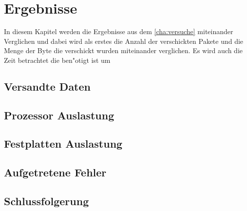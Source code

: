 \chapter{Ergebnisse}
In diesem Kapitel werden die Ergebnisse aus dem \cref{cha:versuche} miteinander Verglichen %
und dabei wird als erstes die Anzahl der verschickten Pakete und die Menge der Byte die %
verschickt wurden miteinander verglichen. Es wird auch die Zeit betrachtet die ben"otigt %
ist um 



\section{Versandte Daten}

\section{Prozessor Auslastung}

\section{Festplatten Auslastung}

\section{Aufgetretene Fehler}

\section{Schlussfolgerung}
